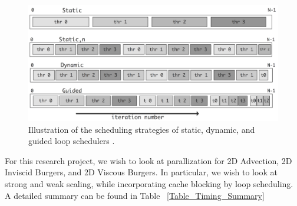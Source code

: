 \documentclass{article}
\begin{document}
 
\begin{figure}[h]
\centering
\includegraphics[width=1.0\textwidth]{Images/Loop_Schedule.png}
\caption{Illustration of the scheduling strategies of static, dynamic, and guided loop schedulers \cite{eijkhout_2021}.}
\label{Loop_Schedule}
\end{figure}

For this research project, we wish to look at parallization for 2D Advection, 2D Inviscid Burgers, and 2D Viscous Burgers. In particular, we wish to look at strong and weak scaling, while incorporating cache blocking by loop scheduling. A detailed summary can be found in Table ~\ref{Table_Timing_Summary}
\end{document}
